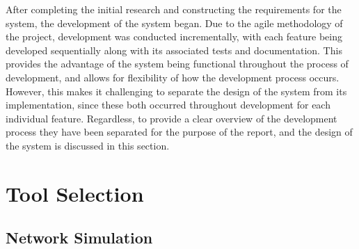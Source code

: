 











After completing the initial research and constructing the requirements for the system, the development of the system began.
Due to the agile methodology of the project, development was conducted incrementally, with each feature being developed sequentially along with its associated tests and documentation.
This provides the advantage of the system being functional throughout the process of development, and allows for flexibility of how the development process occurs.
However, this makes it challenging to separate the design of the system from its implementation, since these both occurred throughout development for each individual feature.
Regardless, to provide a clear overview of the development process they have been separated for the purpose of the report, and the design of the system is discussed in this section.

\section{Tool Selection}
\label{tool_selection}

\subsection{Network Simulation}

